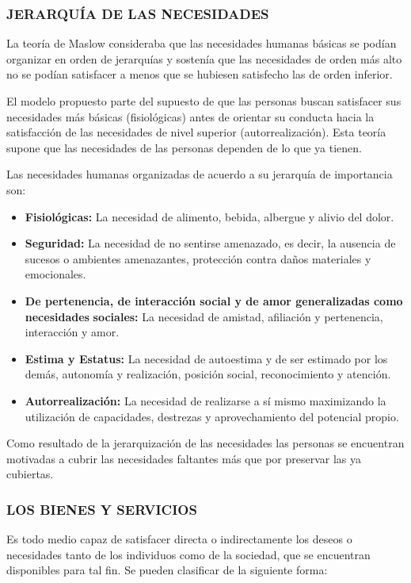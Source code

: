 \subsubsection*{JERARQUÍA DE LAS NECESIDADES}
La teoría de Maslow consideraba que las necesidades humanas básicas se podían organizar en orden de jerarquías y sostenía que las necesidades de orden más alto no se podían satisfacer a menos que se hubiesen satisfecho las de orden inferior.

El modelo propuesto parte del supuesto de que las personas buscan satisfacer sus necesidades más básicas (fisiológicas) antes de orientar su conducta hacia la satisfacción de las necesidades de nivel superior (autorrealización). Esta teoría supone que las necesidades de las personas dependen de lo que ya tienen.

Las necesidades humanas organizadas de acuerdo a su jerarquía de importancia son:

\begin{itemize}
  \item \textbf{Fisiológicas: }La necesidad de alimento, bebida, albergue y alivio del dolor.
  \item \textbf{Seguridad: }La necesidad de no sentirse amenazado, es decir, la ausencia de sucesos o ambientes amenazantes, protección contra daños materiales y emocionales.
  \item \textbf{De pertenencia, de interacción social y de amor generalizadas como necesidades} \textbf{sociales: }La necesidad de amistad, afiliación y pertenencia, interacción y amor.
  \item \textbf{Estima y Estatus: }La necesidad de autoestima y de ser estimado por los demás, autonomía y realización, posición social, reconocimiento y atención.
  \item \textbf{Autorrealización: }La necesidad de realizarse a sí mismo maximizando la utilización de capacidades, destrezas y aprovechamiento del potencial propio.
\end{itemize}
Como resultado de la jerarquización de las necesidades las personas se encuentran motivadas a cubrir las necesidades faltantes más que por preservar las ya cubiertas.



\subsubsection*{LOS BIENES Y SERVICIOS}
Es todo medio capaz de satisfacer directa o indirectamente los deseos o necesidades tanto de los individuos como de la sociedad, que se encuentran disponibles para tal fin. Se pueden clasificar de la siguiente forma:


